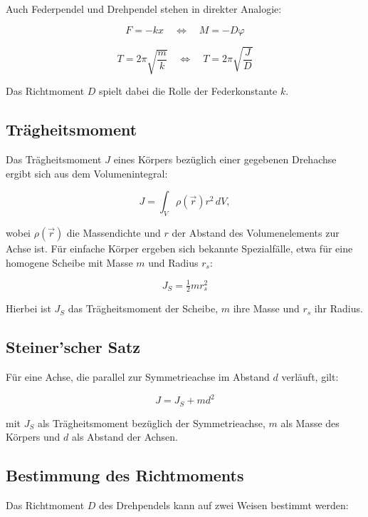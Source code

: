 \vspace{0.25cm}

Auch Federpendel und Drehpendel stehen in direkter Analogie:

\begin{equation}
    F = -kx \quad \Leftrightarrow \quad M = -D\varphi
\end{equation}

\begin{equation}
T = 2\pi\sqrt{\frac{m}{k}} \quad \Leftrightarrow \quad T = 2\pi\sqrt{\frac{J}{D}}
\end{equation}

Das Richtmoment $D$ spielt dabei die Rolle der Federkonstante $k$.

\subsection*{Trägheitsmoment}
Das Trägheitsmoment $J$ eines Körpers bezüglich einer gegebenen Drehachse ergibt sich aus dem Volumenintegral:

\begin{equation}
    J = \int_V \rho(\vec{r}) r^2 \, dV,
\end{equation}

wobei $\rho(\vec{r})$ die Massendichte und $r$ der Abstand des Volumenelements zur Achse ist.  
Für einfache Körper ergeben sich bekannte Spezialfälle, etwa für eine homogene Scheibe mit Masse $m$ und Radius $r_s$:

\begin{equation}
    J_S = \tfrac{1}{2} m r_s^2
\end{equation}

Hierbei ist $J_S$ das Trägheitsmoment der Scheibe, $m$ ihre Masse und $r_s$ ihr Radius.

\subsection*{Steiner’scher Satz}
Für eine Achse, die parallel zur Symmetrieachse im Abstand $d$ verläuft, gilt:

\begin{equation}
    J = J_S + md^2
\end{equation}

mit $J_S$ als Trägheitsmoment bezüglich der Symmetrieachse, $m$ als Masse des Körpers und $d$ als Abstand der Achsen.

\subsection*{Bestimmung des Richtmoments}
Das Richtmoment $D$ des Drehpendels kann auf zwei Weisen bestimmt werden:

